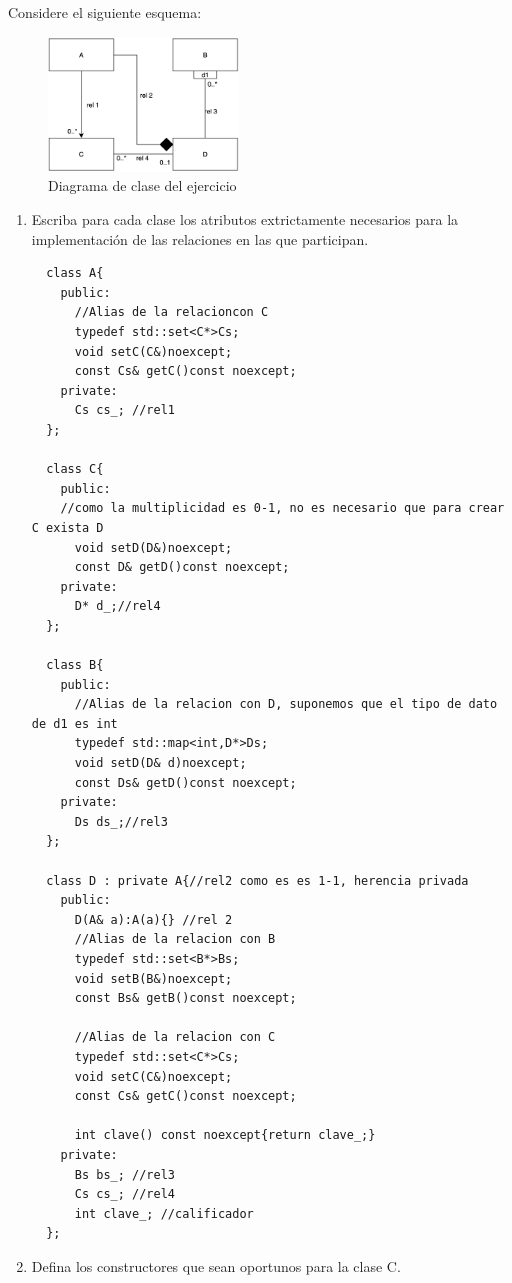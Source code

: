 Considere el siguiente esquema:
\begin{figure}[h]
    \begin{center}
        \includegraphics[width=0.45\textwidth]{assets/Junio2013_1.png}
    \end{center}
    \caption{Diagrama de clase del ejercicio}
\end{figure}
\begin{enumerate}[label = \alph*)]
    \item Escriba para cada clase los atributos extrictamente necesarios para la implementación de las relaciones en las que participan.
\begin{verbatim}
  class A{
    public:
      //Alias de la relacioncon C
      typedef std::set<C*>Cs;
      void setC(C&)noexcept;
      const Cs& getC()const noexcept;
    private:
      Cs cs_; //rel1
  };
  
  class C{  
    public:
    //como la multiplicidad es 0-1, no es necesario que para crear C exista D
      void setD(D&)noexcept;
      const D& getD()const noexcept;
    private:
      D* d_;//rel4
  };
  
  class B{
    public:
      //Alias de la relacion con D, suponemos que el tipo de dato de d1 es int
      typedef std::map<int,D*>Ds;
      void setD(D& d)noexcept;
      const Ds& getD()const noexcept;
    private:
      Ds ds_;//rel3
  };
  
  class D : private A{//rel2 como es es 1-1, herencia privada
    public:
      D(A& a):A(a){} //rel 2
      //Alias de la relacion con B
      typedef std::set<B*>Bs;
      void setB(B&)noexcept;
      const Bs& getB()const noexcept;
  
      //Alias de la relacion con C
      typedef std::set<C*>Cs;
      void setC(C&)noexcept;
      const Cs& getC()const noexcept;
  
      int clave() const noexcept{return clave_;}
    private:
      Bs bs_; //rel3
      Cs cs_; //rel4
      int clave_; //calificador
  };
\end{verbatim}
    \item Defina los constructores que sean oportunos para la clase C.


\end{enumerate}
